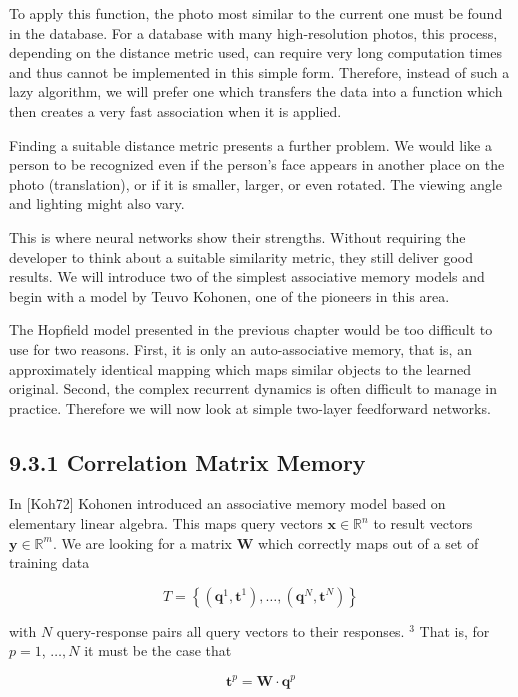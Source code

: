 \documentclass[10pt]{article}
\begin{document}
To apply this function, the photo most similar to the current one must be found in the database. For a database with many high-resolution photos, this process, depending on the distance metric used, can require very long computation times and thus cannot be implemented in this simple form. Therefore, instead of such a lazy algorithm, we will prefer one which transfers the data into a function which then creates a very fast association when it is applied.

Finding a suitable distance metric presents a further problem. We would like a person to be recognized even if the person's face appears in another place on the photo (translation), or if it is smaller, larger, or even rotated. The viewing angle and lighting might also vary.

This is where neural networks show their strengths. Without requiring the developer to think about a suitable similarity metric, they still deliver good results. We will introduce two of the simplest associative memory models and begin with a model by Teuvo Kohonen, one of the pioneers in this area.

The Hopfield model presented in the previous chapter would be too difficult to use for two reasons. First, it is only an auto-associative memory, that is, an approximately identical mapping which maps similar objects to the learned original. Second, the complex recurrent dynamics is often difficult to manage in practice. Therefore we will now look at simple two-layer feedforward networks.

\subsection*{9.3.1 Correlation Matrix Memory}
In [Koh72] Kohonen introduced an associative memory model based on elementary linear algebra. This maps query vectors $\boldsymbol{x} \in \mathbb{R}^{n}$ to result vectors $\boldsymbol{y} \in \mathbb{R}^{m}$. We are looking for a matrix $\boldsymbol{W}$ which correctly maps out of a set of training data

$$
T=\left\{\left(\boldsymbol{q}^{1}, \boldsymbol{t}^{1}\right), \ldots,\left(\boldsymbol{q}^{N}, \boldsymbol{t}^{N}\right)\right\}
$$

with $N$ query-response pairs all query vectors to their responses. ${ }^{3}$ That is, for $p=1$, $\ldots, N$ it must be the case that


\begin{equation*}
\boldsymbol{t}^{p}=\boldsymbol{W} \cdot \boldsymbol{q}^{p} \tag{9.3}
\end{equation*}
\end{document}
